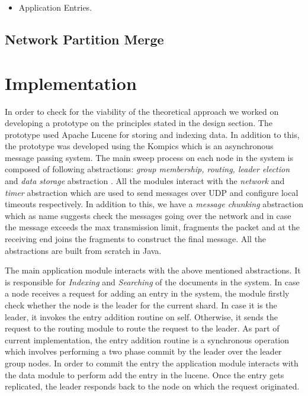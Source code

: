 \documentclass[12pt,a4paper,twoside,openright]{book}
\begin{document}
\begin{itemize}

\item Application Entries.

\end{itemize}


\section{Network Partition Merge}



\chapter{Implementation}
\label{sec:impl}

In order to check for the viability of the theoretical approach we worked on developing a prototype on the principles stated in the design section. The prototype used Apache Lucene for storing and indexing data. In addition to this, the prototype was developed using the Kompics which is an asynchronous message passing system. The main sweep process on each node in the system is composed of following abstractions: \textit {group membership, routing, leader election} and \textit{data storage} abstraction . All the modules interact with the \textit{network} and \textit{timer} abstraction which are used to send messages over UDP and configure local timeouts respectively. In addition to this, we have a \textit{message chunking} abstraction which as name suggests check the messages going over the network and in case the message exceeds the max transmission limit, fragments the packet and at the receiving end joins the fragments to construct the final message. All the abstractions are built from scratch in Java.
\par The main application module interacts with the above mentioned abstractions. It is responsible for \textit{Indexing} and \textit{Searching} of the documents in the system. In case a node receives a request for adding an entry in the system, the module firstly check whether the node is the leader for the current shard. In case it is the leader, it invokes the entry addition routine on self. Otherwise, it sends the request to the routing module to route the request to the leader. As part of current implementation, the entry addition routine is a synchronous operation which involves performing a two phase commit by the leader over the leader group nodes. In order to commit the entry the application module interacts with the data module to perform add the entry in the lucene. Once the entry gets replicated, the leader responds back to the node on which the request originated. 
\end{document}
